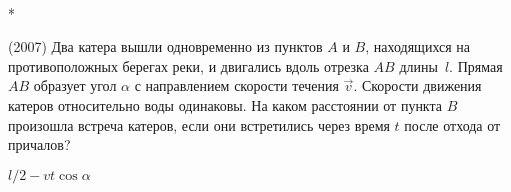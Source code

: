 \begin{samepage}
\begin{ex} \nopagebreak \hspace{0pt} \\* 
\begin{minipage}{.65\textwidth}
(2007) Два катера вышли одновременно из пунктов $A$ и $B$, находящихся на противоположных берегах реки, и двигались вдоль отрезка $AB$ длины~$l$. 
Прямая $AB$ образует угол $\alpha$ с направлением скорости течения $\vec v$. Скорости движения катеров относительно воды одинаковы.
На каком расстоянии от пункта $B$ произошла встреча катеров, если они встретились через время $t$ после отхода от причалов?
\end{minipage}
\begin{minipage}{.35\textwidth}
\centering

\end{minipage}
\begin{ans}
$l/2 - vt \cos \alpha$
\end{ans}
\end{ex}
\end{samepage}
